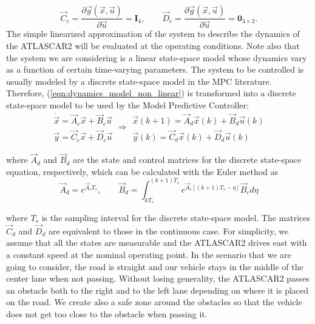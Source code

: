 \[
\vec{C}_c=\frac{\partial \vec{g}(\vec{x},\vec{u})}{\partial \vec{u}} = \mathbf{I}_4, 
\qquad
\vec{D}_c=\frac{\partial \vec{g}(\vec{x},\vec{u})}{\partial \vec{u}}=\mathbf{0}_{4\times2}. 
\]
The simple linearized approximation of the system to describe the dynamics of the ATLASCAR2 will be evaluated at the operating conditions. Note also that the system we are considering is a linear state-space model whose dynamics vary as a function of certain time-varying parameters. The system to be controlled is usually modeled by a discrete state-space model in the MPC literature. Therefore, (\ref{eqn:dynamics_model_non_linear})
is transformed into a discrete state-space model to be used by the Model Predictive Controller:
\begin{equation*}
\label{eqn:dynamics_ss_obstacle_avoidance_dis}
\begin{array}{ll}
\dot{\vec{x}} =\vec{A}_c \vec{x}+ \vec{B}_c \vec{u}\\
\vec{y} =\vec{C}_c \vec{x} + \vec{D}_c \vec{u}
\end{array}
\Rightarrow
\begin{array}{rr}
{\vec{x}}(k+1) =\vec{A}_d \vec{x}(k)+ \vec{B}_d \vec{u}(k)\\
\vec{y}(k) =\vec{C}_d \vec{x}(k) + \vec{D}_d \vec{u}(k)
\end{array}
\end{equation*}

where $\vec{A}_d$ and $\vec{B}_d$ are the state and control matrices for the discrete state-space equation, respectively, which can be calculated with the Euler method as
\begin{equation*}
\vec{A}_d = e^{\vec{A}_cT_s},\qquad \vec{B}_d = \int_{kT_s}^{(k+1)T_s} e^{\vec{A}_c[(k+1)T_s-\eta]}\vec{B}_c d\eta
\end{equation*}

where $T_s$ is the sampling interval for the discrete state-space model. The matrices $\vec{C}_d$ and $\vec{D}_d$ are equivalent to those in the continuous case. For simplicity, we assume that all the states are measurable and the ATLASCAR2 drives east with a constant speed at the nominal operating point. In the scenario that we are going to consider, the road is straight and our vehicle stays in the middle of the center lane when not passing. Without losing generality, the ATLASCAR2 passes an obstacle both to the right and to the left lane depending on where it is placed on the road. We create also a safe zone around the obstacles so that the vehicle does not get too close to the obstacle when passing it.

